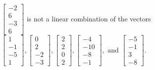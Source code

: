 \begin{exercise}
\begin{exerciseStatement}
  \end{exerciseStatement}
  \begin{exerciseAnswer}
   \(\left[\begin{array}{c}
-2 \\
6 \\
-3 \\
6
\end{array}\right]\) 
  	 is not  
	a linear combination of the vectors \(\left[\begin{array}{c}
1 \\
-1 \\
-5 \\
1
\end{array}\right] , \left[\begin{array}{c}
0 \\
2 \\
-2 \\
-3
\end{array}\right] , \left[\begin{array}{c}
2 \\
2 \\
0 \\
2
\end{array}\right] , \left[\begin{array}{c}
-4 \\
-10 \\
-8 \\
-1
\end{array}\right] , \text{ and } \left[\begin{array}{c}
-5 \\
-1 \\
3 \\
-8
\end{array}\right]\).

	
  


  \end{exerciseAnswer}
\end{exercise}